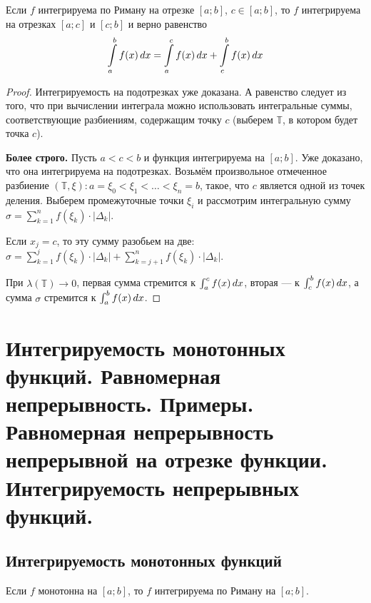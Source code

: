 \documentclass[a4paper]{article}
\theoremstyle{named}
\newcommand{\T}{\mathbb{T}}
\renewcommand{\int}{\intop}
\begin{document}
        \begin{consequence*}
            Если $f$ интегрируема по Риману на отрезке $[a; b]$, $c \in [a; b]$, то $f$ интегрируема на отрезках $[a; c]$ и $[c; b]$ и верно равенство
            \begin{equation*}
                \int_a^b f(x) \dd x = \int_a^c f(x) \dd x + \int_c^b f(x) \dd x
            \end{equation*}
        \end{consequence*}

        \begin{proof}
            Интегрируемость на подотрезках уже доказана. А равенство следует из того, что при вычислении интеграла можно использовать интегральные суммы, соответствующие разбиениям, содержащим точку $c$ (выберем $\T$, в котором будет точка $c$).

            \textbf{Более строго.} Пусть $a < c < b$ и функция интегрируема на $[a; b]$. Уже доказано, что она интегрируема на подотрезках. Возьмём произвольное отмеченное разбиение $(\T, \xi): a = \xi_0 < \xi_1 < \dots < \xi_n = b$, такое, что $c$ является одной из точек деления. Выберем промежуточные точки $\xi_i$ и рассмотрим интегральную сумму $\sigma = \sum_{k = 1}^n f(\xi_k) \cdot |\Delta_k|$.

            Если $x_j = c$, то эту сумму разобьем на две: $\sigma = \sum_{k = 1}^j f(\xi_k) \cdot |\Delta_k| + \sum_{k = j + 1}^n f(\xi_k) \cdot |\Delta_k|$. 

            При $\lambda(\T) \to 0$, первая сумма стремится к $\int_a^c f(x) \dd x$, вторая --- к $\int_c^b f(x) \dd x$, а сумма $\sigma$ стремится к $\int_a^b f(x) \dd x$.
        \end{proof}

    \section{Интегрируемость монотонных функций. Равномерная непрерывность. Примеры. Равномерная непрерывность непрерывной на отрезке функции. Интегрируемость непрерывных функций.}

        \subsection{Интегрируемость монотонных функций}

        \begin{consequence*}
            Если $f$ монотонна на $[a; b]$, то $f$ интегрируема по Риману на $[a; b]$.
        \end{consequence*}
\end{document}
